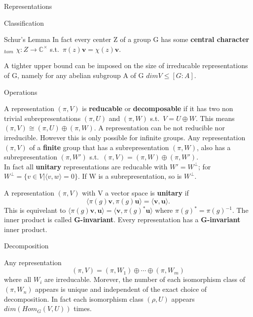 \documentclass[12pt, letterpaper]{article}
\newcommand{\C}{\mathbb{C}}
\begin{document}
\begin{section}{Representations}
\begin{subsection}{Classification}
\begin{subsubsection}{Schur's Lemma}
      In fact every center Z of a group G has some \textbf{central
        character\(_{hom}\)} \(\chi: Z \to \C^{\times}\) s.t.\
      \(\pi(z) \textbf{v} = \chi(z) \textbf{v}\).

      A tighter upper bound can be imposed on the size of irreducable
      representations of G, namely for any abelian subgroup A of G
      \(dim V \leq [G : A]\).

    \end{subsubsection}

    \begin{subsubsection}{Operations}

      A representation \((\pi, V)\) is \textbf{reducable} or
      \textbf{decomposable} if it has two non trivial subrepresentations
      \((\pi, U)\) and \((\pi, W)\) s.t.\ \(V = U \oplus W\). This means
      \((\pi, V) \cong (\pi, U) \oplus (\pi, W)\). A representation can be not
      reducible nor irreducible. However this is only possible for infinite
      groups. Any representation \((\pi, V)\) of a \textbf{finite} group that
      has a subrepresentation \((\pi, W)\), also has a subrepresentation
      \((\pi, W')\) s.t.\ \((\pi, V) = (\pi, W) \oplus (\pi, W')\). \\
      In fact all \textbf{unitary} representations are reducable with
      \(W' = W^{\bot}\); for
      \(W^{\bot} = \{v \in V | \langle v, w \rangle = 0\}\). If W is a
      subrepresentation, so is \(W^{\bot}\).

      A representation \((\pi, V)\) with V a vector space is \textbf{unitary}
      if \[\langle \pi(g) \textbf{v}, \pi(g) \textbf{u} \rangle =
        \langle \textbf{v}, \textbf{u} \rangle.\] This is equivelant to
      \(\langle \pi(g) \textbf{v}, \textbf{u} \rangle =
      \langle \textbf{v}, \pi(g){}^{*} \textbf{u} \rangle\) where
      \(\pi(g){}^{*} = \pi(g){}^{-1}\). The inner product is called
      \textbf{G-invariant}. Every representation has a \textbf{G-invariant}
      inner product.

    \end{subsubsection}

    \begin{subsubsection}{Decomposition}

      Any representation \[(\pi, V) =
        (\pi, W_{1}) \oplus \cdots \oplus (\pi, W_{m})\] where all \(W_{i}\) are
      irreducable. Morever, the number of each isomorphism class of
      \((\pi, W_{n})\) appears is unique and independent of the exact choice of
      decomposition. In fact each isomorphism class \((\rho, U)\) appears
      \(dim(Hom_{G}(V, U))\) times.


\end{subsubsection}
\end{subsection}
\end{section}
\end{document}
